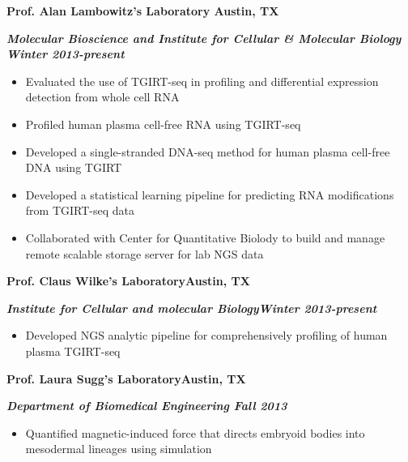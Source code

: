 \documentclass[dvips,11pt]{article}
\begin{document}
\noindent \centerline{\bf Prof. Alan Lambowitz's Laboratory \hfill	Austin, TX}
\noindent \centerline{\textit{\textbf{Molecular Bioscience and Institute for Cellular \& Molecular Biology  \hfill Winter 2013-present}}}
\vspace{-2mm}
\begin{itemize} \itemsep1pt \parskip0pt 
	\setlength{\itemsep}{0pt}
	\item Evaluated the use of TGIRT-seq in profiling and differential expression detection from whole cell RNA
	\item Profiled human plasma cell-free RNA using TGIRT-seq
	\item Developed a single-stranded DNA-seq method for human plasma cell-free DNA using TGIRT
	\item Developed a statistical learning pipeline for predicting RNA modifications from TGIRT-seq data
	\item Collaborated with Center for Quantitative Biolody to build and manage remote scalable storage server for lab NGS data
\end{itemize}

\noindent \centerline{\bf Prof. Claus Wilke's Laboratory\hfill	Austin, TX}
\noindent \centerline{\textit {\textbf{Institute for Cellular and molecular Biology\hfill Winter 2013-present}}}
\vspace{-2mm}
\begin{itemize} \itemsep1pt \parskip0pt 
	\setlength{\itemsep}{0pt}
	\item Developed NGS analytic pipeline for comprehensively profiling of human plasma TGIRT-seq
\end{itemize}

\noindent \centerline{\bf Prof. Laura Sugg's Laboratory\hfill	Austin, TX}
\noindent \centerline{\textbf{\textit{Department of Biomedical Engineering \hfill Fall 2013}}}
\vspace{-2mm}
\begin{itemize} \itemsep1pt \parskip0pt 
	\setlength{\itemsep}{0pt}
	\item Quantified magnetic-induced force that directs embryoid bodies into mesodermal lineages using simulation
\end{itemize}
\end{document}

